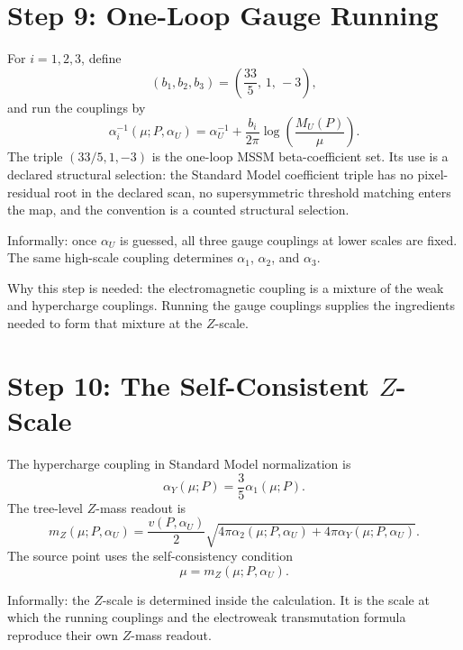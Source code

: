 \documentclass[11pt]{article}
\theoremstyle{remark}
\begin{document}
\section{Step 9: One-Loop Gauge Running}

For \(i=1,2,3\), define
\begin{equation}
(b_1,b_2,b_3)=\left(\frac{33}{5},\,1,\,-3\right),
\label{eq:b}
\end{equation}
and run the couplings by
\begin{equation}
\alpha_i^{-1}(\mu;P,\alpha_U)
=
\alpha_U^{-1}
+
\frac{b_i}{2\pi}\log\!\left(\frac{M_U(P)}{\mu}\right).
\label{eq:running}
\end{equation}
The triple \((33/5,1,-3)\) is the one-loop MSSM beta-coefficient set. Its use
is a declared structural selection: the Standard Model coefficient triple has
no pixel-residual root in the declared scan, no supersymmetric threshold
matching enters the map, and the convention is a counted structural selection.

Informally: once \(\alpha_U\) is guessed, all three gauge couplings at lower scales are fixed. The same high-scale coupling determines \(\alpha_1\), \(\alpha_2\), and \(\alpha_3\).

Why this step is needed: the electromagnetic coupling is a mixture of the weak and hypercharge couplings. Running the gauge couplings supplies the ingredients needed to form that mixture at the \(Z\)-scale.

\section{Step 10: The Self-Consistent \(Z\)-Scale}

The hypercharge coupling in Standard Model normalization is
\begin{equation}
\alpha_Y(\mu;P)=\frac{3}{5}\alpha_1(\mu;P).
\label{eq:alphaY}
\end{equation}
The tree-level \(Z\)-mass readout is
\begin{equation}
m_Z(\mu;P,\alpha_U)
=
\frac{v(P,\alpha_U)}{2}
\sqrt{4\pi\alpha_2(\mu;P,\alpha_U)+4\pi\alpha_Y(\mu;P,\alpha_U)}.
\label{eq:mZtree}
\end{equation}
The source point uses the self-consistency condition
\begin{equation}
\mu=m_Z(\mu;P,\alpha_U).
\label{eq:mZfixed}
\end{equation}

Informally: the \(Z\)-scale is determined inside the calculation. It is the scale at which the running couplings and the electroweak transmutation formula reproduce their own \(Z\)-mass readout.
\end{document}
